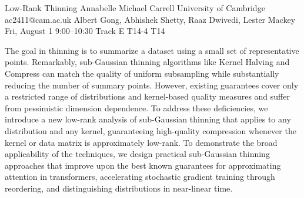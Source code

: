 \begin{talk}
  {Low-Rank Thinning}%
  {Annabelle Michael Carrell}%
  {University of Cambridge}%
  {ac2411@cam.ac.uk}%
  {Albert Gong, Abhishek Shetty, Raaz Dwivedi, Lester Mackey}%
  {}%
  {Fri, August 1 9:00–10:30 Track E}%
  {T14-4}%
  {T14}%
  
				
			
The goal in thinning is to summarize a dataset using a small set of representative points. Remarkably, sub-Gaussian thinning algorithms like Kernel Halving and Compress can match the quality of uniform subsampling while substantially reducing the number of summary points. However, existing guarantees cover only a restricted range of distributions and kernel-based quality measures and suffer from pessimistic dimension dependence. To address these deficiencies, we introduce a new low-rank analysis of sub-Gaussian thinning that applies to any distribution and any kernel, guaranteeing high-quality compression whenever the kernel or data matrix is approximately low-rank. To demonstrate the broad applicability of the techniques, we design practical sub-Gaussian thinning approaches that improve upon the best known guarantees for approximating attention in transformers, accelerating stochastic gradient training through reordering, and distinguishing distributions in near-linear time. 

\medskip

\end{talk}

